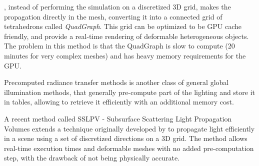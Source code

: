 \cite{journals/cgf/WangWHSYG10}, instead of performing the simulation on a discretized 3D grid, makes the propagation directly in the mesh, converting it into a connected grid of tetrahedrons called \emph{QuadGraph}. This grid can be optimized to be GPU cache friendly, and provide a real-time rendering of deformable heterogeneous objects. The problem in this method is that the QuadGraph is slow to compute (20 minutes for very complex meshes) and has heavy memory requirements for the GPU. 

Precomputed radiance transfer methods is another class of general global illumination methods, that generally pre-compute part of the lighting and store it in tables\citep{Donner:2009:EBM:1531326.1531336}, allowing to retrieve it efficiently with an additional memory cost.  

A recent method called SSLPV - Subsurface Scattering Light Propagation Volumes \citep{Borlum:2011:SSL:2018323.2018325} extends a technique originally developed by \cite{Kaplanyan:2010:CLP:1730804.1730821} to propagate light efficiently in a scene using a set of discretized directions on a 3D grid. The method allows real-time execution times and deformable meshes with no added pre-computation step, with the drawback of not being physically accurate. 

